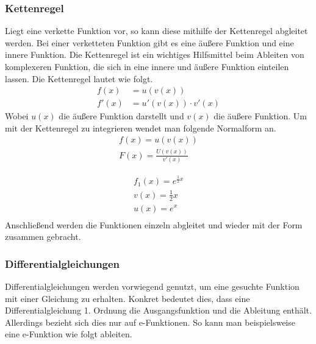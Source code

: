 \subsubsection{Kettenregel}
Liegt eine verkette Funktion vor, so kann diese mithilfe der Kettenregel abgleitet werden. Bei einer verketteten Funktion gibt es eine äußere Funktion und eine innere Funktion. 
Die Kettenregel ist ein wichtiges Hilfsmittel beim Ableiten von komplexeren Funktion, die sich in eine innere und äußere Funktion einteilen lassen. Die Kettenregel lautet wie folgt.
\begin{align*}
	f(x)&=u(v(x))\\
	f'(x)&=u'(v(x))\cdot v'(x)
\end{align*}
Wobei $u(x)$ die äußere Funktion darstellt und $v(x)$ die äußere Funktion. 
Um mit der Kettenregel zu integrieren wendet man folgende Normalform an. 
\begin{align*}
	f(x)=u(v(x))\\
	F(x)=\frac{U(v(x))}{v'(x)}
\end{align*}
\begin{beispiel}
	\begin{align*}
		f_1(x)=e^{\frac{1}{2}x}\tag{Aufteilen in innere- und äußere Funktion}\\
		v(x)=\frac{1}{2}x \tag{Die innere Funktion}\\
		u(x)=e^x\tag{Die äußere Funktion}\\
	\end{align*}
	Anschließend werden die Funktionen einzeln abgleitet und wieder mit der Form zusammen gebracht.
\end{beispiel}
\subsubsection{Differentialgleichungen}
Differentialgleichungen werden vorwiegend genutzt, um eine gesuchte Funktion mit einer Gleichung zu erhalten. Konkret bedeutet dies, dass eine Differentialgleichung 1. Ordnung
die Ausgangsfunktion und die Ableitung enthält. Allerdings bezieht sich dies nur auf e-Funktionen. So kann man beispielsweise eine e-Funktion wie folgt ableiten. 

